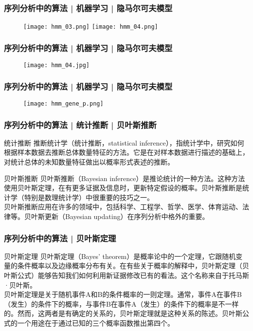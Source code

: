 \begin{frame}
  \frametitle{序列分析中的算法 | 机器学习 | 隐马尔可夫模型}
  \begin{figure}
    \centering
    \texttt{[image: hmm\_03.png]}
    \texttt{[image: hmm\_04.png]}
  \end{figure}
\end{frame}

\begin{frame}
  \frametitle{序列分析中的算法 | 机器学习 | 隐马尔可夫模型}
  \begin{figure}
    \centering
    \texttt{[image: hmm\_04.jpg]}
  \end{figure}
\end{frame}

\begin{frame}
  \frametitle{序列分析中的算法 | 机器学习 | 隐马尔可夫模型}
  \begin{figure}
    \centering
    \texttt{[image: hmm\_gene\_p.png]}
  \end{figure}
\end{frame}

\begin{frame}
  \frametitle{序列分析中的算法 | 统计推断 | 贝叶斯推断}
  \begin{block}{统计推断}
    推断统计学（统计推断，statistical inference），指统计学中，研究如何根据样本数据去推断总体数量特征的方法。它是在对样本数据进行描述的基础上，对统计总体的未知数量特征做出以概率形式表述的推断。
  \end{block}
  \pause
  \begin{block}{贝叶斯推断}
    贝叶斯推断（Bayesian inference）是推论统计的一种方法。这种方法使用贝叶斯定理，在有更多证据及信息时，更新特定假设的概率。贝叶斯推断是统计学（特别是数理统计学）中很重要的技巧之一。\\
    \vspace{0.3em}
    贝叶斯推断应用在许多的领域中，包括科学、工程学、哲学、医学、体育运动、法律等。贝叶斯更新（Bayesian updating）在序列分析中格外的重要。
  \end{block}
\end{frame}

\begin{frame}
  \frametitle{序列分析中的算法 | 贝叶斯定理}
  \begin{block}{贝叶斯定理}
    贝叶斯定理（Bayes' theorem）是概率论中的一个定理，它跟随机变量的条件概率以及边缘概率分布有关。在有些关于概率的解释中，贝叶斯定理（贝叶斯公式）能够告知我们如何利用新证据修改已有的看法。这个名称来自于托马斯·贝叶斯。\\
    \vspace{0.3em}
贝叶斯定理是关于随机事件A和B的条件概率的一则定理。通常，事件A在事件B（发生）的条件下的概率，与事件B在事件A（发生）的条件下的概率是不一样的。然而，这两者是有确定的关系的，贝叶斯定理就是这种关系的陈述。贝叶斯公式的一个用途在于通过已知的三个概率函数推出第四个。
  \end{block}
\end{frame}

